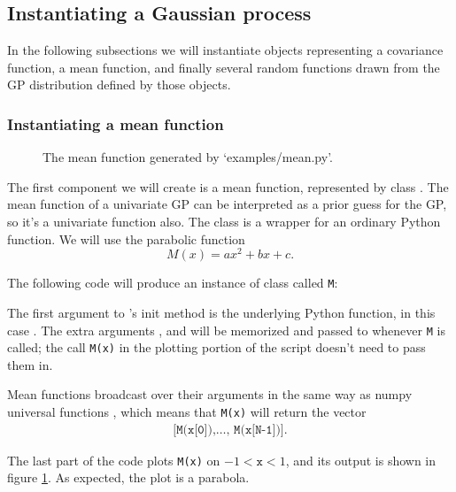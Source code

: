 \documentclass{manual}
\begin{document}
\subsection{Instantiating a Gaussian process}\label{sub:inst}

In the following subsections we will instantiate objects representing a covariance function, a mean function, and finally several random functions drawn from the GP distribution defined by those objects.

\subsubsection{Instantiating a mean function}\label{subsub:mean}

\begin{figure}
    \centering
    \caption{The mean function generated by {\sffamily `examples/mean.py'}.}
    \label{fig:mean}
\end{figure}

The first component we will create is a mean function, represented by class . The mean function of a univariate GP can be interpreted as a prior guess for the GP, so it's a univariate function also. The  class is a wrapper for an ordinary Python function. We will use the parabolic function
\begin{equation}
    M(x) = ax^2 + bx + c.
\end{equation}

The following code will produce an instance of class  called \texttt{M}:


The first argument to 's init method is the underlying Python function, in this case . The extra arguments ,   and  will be memorized and passed to  whenever \texttt{M} is called; the call \texttt{M(x)} in the plotting portion of the script doesn't need to pass them in.

Mean functions broadcast over their arguments in the same way as numpy universal functions \cite{numpybook}, which means that \texttt{M(x)} will return the vector 
\begin{eqnarray*}
    \texttt{[M(x[0]),\ldots, M(x[N-1])]}.
\end{eqnarray*}

The last part of the code plots \texttt{M(x)} on $-1<\texttt{x}<1$, and its output is shown in figure \ref{fig:mean}. As expected, the plot is a parabola.
\end{document}
